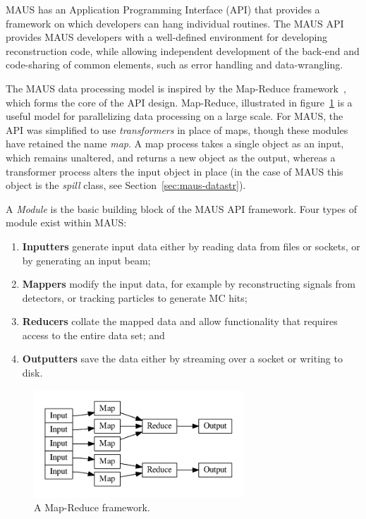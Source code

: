 \documentclass[11pt]{article}
\begin{document}
MAUS has an Application Programming Interface (API) that provides a framework on which developers can hang individual routines. The MAUS API provides MAUS developers with a well-defined environment for developing reconstruction code, while allowing independent development of the back-end and code-sharing of common elements, such as error handling and data-wrangling. 

The MAUS data processing model is inspired by the Map-Reduce framework~\cite{MapReduce}, which forms the core of the API design. Map-Reduce, illustrated in figure~\ref{fig:mapreduce} is a useful model for parallelizing data processing on a large scale. For MAUS, the API was simplified to use \emph{transformers} in place of maps, though these modules have retained the name \emph{map}. A map process takes a single object as an input, which remains unaltered, and returns a new object as the output, whereas a transformer process alters the input object in place (in the case of MAUS this object is the \emph{spill} class, see Section~\ref{sec:maus-datastr}).

A \emph{Module} is the basic building block of the MAUS API framework. Four types of module exist within MAUS:

\begin{enumerate}
\item \textbf{Inputters} generate input data either by reading data from files or sockets, or by generating an input beam;
\item \textbf{Mappers} modify the input data, for example by reconstructing signals from detectors, or tracking  particles to generate MC hits;
\item \textbf{Reducers} collate the mapped data and allow functionality that requires access to the entire data set; and
\item \textbf{Outputters} save the data  either by streaming over a socket or writing to disk.
\end{enumerate}

\begin{figure}[!htb]
\centering
\includegraphics[width=0.7\textwidth]{figs/map_reduce.pdf}
\caption{A Map-Reduce framework.}
\label{fig:mapreduce}
\end{figure}
\end{document}
